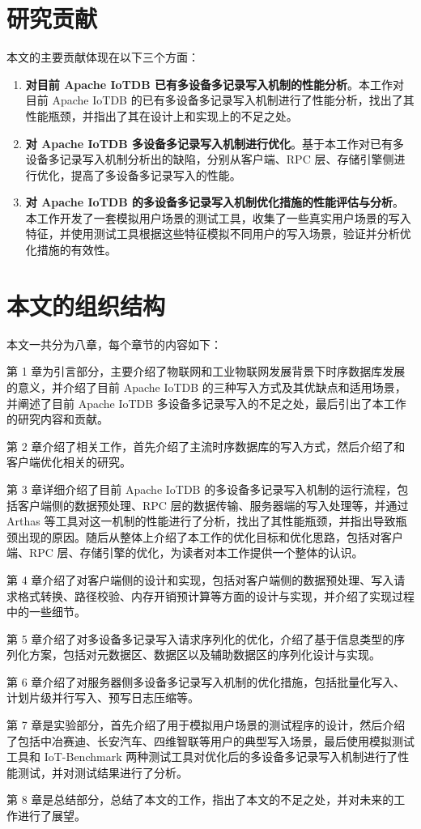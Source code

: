 \section{研究贡献}
本文的主要贡献体现在以下三个方面：
\begin{enumerate}
  \item \textbf{对目前 Apache IoTDB 已有多设备多记录写入机制的性能分析}。本工作对目前 Apache IoTDB 的已有多设备多记录写入机制进行了性能分析，找出了其性能瓶颈，并指出了其在设计上和实现上的不足之处。
  \item \textbf{对 Apache IoTDB 多设备多记录写入机制进行优化}。基于本工作对已有多设备多记录写入机制分析出的缺陷，分别从客户端、RPC 层、存储引擎侧进行优化，提高了多设备多记录写入的性能。
  \item \textbf{对 Apache IoTDB 的多设备多记录写入机制优化措施的性能评估与分析}。本工作开发了一套模拟用户场景的测试工具，收集了一些真实用户场景的写入特征，并使用测试工具根据这些特征模拟不同用户的写入场景，验证并分析优化措施的有效性。
\end{enumerate}

\section{本文的组织结构}

本文一共分为八章，每个章节的内容如下：

第 1 章为引言部分，主要介绍了物联网和工业物联网发展背景下时序数据库发展的意义，并介绍了目前 Apache IoTDB 的三种写入方式及其优缺点和适用场景，并阐述了目前 Apache IoTDB 多设备多记录写入的不足之处，最后引出了本工作的研究内容和贡献。

第 2 章介绍了相关工作，首先介绍了主流时序数据库的写入方式，然后介绍了和客户端优化相关的研究。

第 3 章详细介绍了目前 Apache IoTDB 的多设备多记录写入机制的运行流程，包括客户端侧的数据预处理、RPC 层的数据传输、服务器端的写入处理等，并通过 Arthas 等工具对这一机制的性能进行了分析，找出了其性能瓶颈，并指出导致瓶颈出现的原因。随后从整体上介绍了本工作的优化目标和优化思路，包括对客户端、RPC 层、存储引擎的优化，为读者对本工作提供一个整体的认识。

第 4 章介绍了对客户端侧的设计和实现，包括对客户端侧的数据预处理、写入请求格式转换、路径校验、内存开销预计算等方面的设计与实现，并介绍了实现过程中的一些细节。

第 5 章介绍了对多设备多记录写入请求序列化的优化，介绍了基于信息类型的序列化方案，包括对元数据区、数据区以及辅助数据区的序列化设计与实现。

第 6 章介绍了对服务器侧多设备多记录写入机制的优化措施，包括批量化写入、计划片级并行写入、预写日志压缩等。

第 7 章是实验部分，首先介绍了用于模拟用户场景的测试程序的设计，然后介绍了包括中冶赛迪、长安汽车、四维智联等用户的典型写入场景，最后使用模拟测试工具和 IoT-Benchmark\cite{liu2019benchmarking} 两种测试工具对优化后的多设备多记录写入机制进行了性能测试，并对测试结果进行了分析。

第 8 章是总结部分，总结了本文的工作，指出了本文的不足之处，并对未来的工作进行了展望。